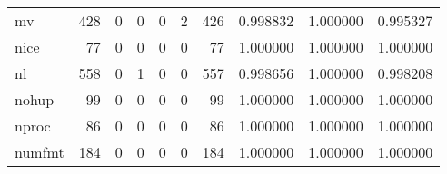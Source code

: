 \begin{tabular}{lrrrrrrrrr}
mv        &                                   428 &                                                  0 &                                                  0 &                                                  0 &                                                  2 &                                                426 &                                           0.998832 &                               1.000000 &                             0.995327 \\
nice      &                                    77 &                                                  0 &                                                  0 &                                                  0 &                                                  0 &                                                 77 &                                           1.000000 &                               1.000000 &                             1.000000 \\
nl        &                                   558 &                                                  0 &                                                  1 &                                                  0 &                                                  0 &                                                557 &                                           0.998656 &                               1.000000 &                             0.998208 \\
nohup     &                                    99 &                                                  0 &                                                  0 &                                                  0 &                                                  0 &                                                 99 &                                           1.000000 &                               1.000000 &                             1.000000 \\
nproc     &                                    86 &                                                  0 &                                                  0 &                                                  0 &                                                  0 &                                                 86 &                                           1.000000 &                               1.000000 &                             1.000000 \\
numfmt    &                                   184 &                                                  0 &                                                  0 &                                                  0 &                                                  0 &                                                184 &                                           1.000000 &                               1.000000 &                             1.000000 \\

\end{tabular}
